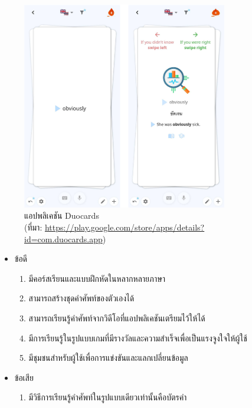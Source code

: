 \documentclass[12pt,oneside,openright,a4paper]{cpe-thai-project}
\begin{document}
\begin{figure}[!h]\centering
	\includegraphics[width=0.8\textwidth, keepaspectratio=true]{image/chap2/duocardsEX.png}
	\caption[แอปพลิเคชัน Duocards]{แอปพลิเคชัน Duocards\\ (ที่มา: \href {https://play.google.com/store/apps/details?id=com.duocards.app} {https://play.google.com/store/apps/details?id=com.duocards.app})\centering}\label{fig:duocardsEx}
\end{figure}

\begin{itemize}
	\item ข้อดี
	      \begin{enumerate}
		      \item มีคอร์สเรียนและแบบฝึกหัดในหลากหลายภาษา
		      \item สามารถสร้างชุดคำศัพท์ของตัวเองได้
		      \item สามารถเรียนรู้คำศัพท์จากวิดีโอที่แอปพลิเคชันเตรียมไว้ให้ได้
		      \item มีการเรียนรู้ในรูปแบบเกมที่มีรางวัลและความสำเร็จเพื่อเป็นแรงจูงใจให้ผู้ใช้
		      \item มีชุมชนสำหรับผู้ใช้เพื่อการแข่งขันและแลกเปลี่ยนข้อมูล
	      \end{enumerate}
	\item ข้อเสีย
	      \begin{enumerate}
		      \item มีวิธีการเรียนรู้คำศัพท์ในรูปแบบเดียวเท่านั้นคือบัตรคำ
	      \end{enumerate}
\end{itemize}
\end{document}
